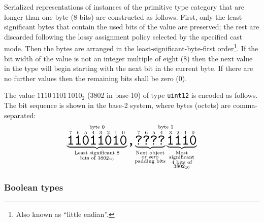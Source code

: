 Serialized representations of instances of the primitive type category that are longer than one byte (8 bits)
are constructed as follows.
First, only the least significant bytes that contain the used bits of the value are preserved;
the rest are discarded following the lossy assignment policy selected by the specified cast mode.
Then the bytes are arranged in the least-significant-byte-first order\footnote{Also known as ``little endian''.}.
If the bit width of the value is not an integer multiple of eight (8) then the next value in the type will begin
starting with the next bit in the current byte. If there are no further values then the remaining bits
shall be zero (0).

\begin{remark}
    The value $1110\,1101\,1010_2$ (3802 in base-10) of type \verb|uint12| is encoded as follows.
    The bit sequence is shown in the base-2 system, where bytes (octets) are comma-separated:
    $$
        \overset{\text{byte 0}}{%
            \underbrace{%
                \overset{7}{\hugett{1}}
                \overset{6}{\hugett{1}}
                \overset{5}{\hugett{0}}
                \overset{4}{\hugett{1}}
                \overset{3}{\hugett{1}}
                \overset{2}{\hugett{0}}
                \overset{1}{\hugett{1}}
                \overset{0}{\hugett{0}}
            }_{\substack{\text{Least significant 8} \\ \text{bits of }3802_{10}}}%
        }%
        \hugett{,}%
        \overset{\text{byte 1}}{%
            \underbrace{
                \overset{7}{\hugett{?}}
                \overset{6}{\hugett{?}}
                \overset{5}{\hugett{?}}
                \overset{4}{\hugett{?}}
            }_{\substack{\text{Next object} \\ \text{or zero} \\ \text{padding bits}}}%
            \underbrace{
                \overset{3}{\hugett{1}}
                \overset{2}{\hugett{1}}
                \overset{1}{\hugett{1}}
                \overset{0}{\hugett{0}}
            }_{\substack{\text{Most} \\ \text{significant} \\ \text{4 bits of} \\ \text{3802}_{10}}}%
        }
    $$
\end{remark}

\subsubsection{Boolean types}\label{sec:dsdl_serialized_bool}

